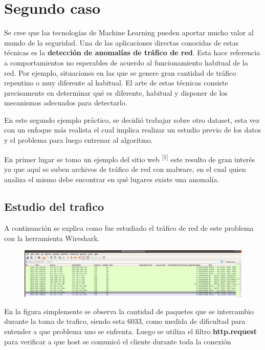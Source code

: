 \documentclass[a4paper,10pt]{article}
\begin{document}
\newpage
\section{Segundo caso}

Se cree que las tecnologías de Machine Learning pueden aportar mucho valor al mundo de la seguridad. Una de las aplicaciones directas conocidas de estas técnicas es la \textbf{detección de anomalías de tráfico de red}. Esta hace referencia a comportamientos no esperables de acuerdo al funcionamiento habitual de la red. Por ejemplo, situaciones en las que se genere gran cantidad de tráfico repentino o muy diferente al habitual. El arte de estas técnicas consiste precisamente en determinar qué es diferente, habitual y disponer de los mecanismos adecuados para detectarlo. 

En este segundo ejemplo práctico, se decidió trabajar sobre otro dataset, esta vez con un enfoque más realista el cual implica realizar un estudio previo de los datos y el problema para luego entrenar al algoritmo.

\medskip
En primer lugar se tomo un ejemplo del sitio web \textsuperscript{[1]} este resulto de gran interés ya que aquí se suben archivos de tráfico de red con malware, en el cual quien analiza el mismo debe encontrar en qué lugares existe una anomalía.

\subsection{Estudio del trafico}

A continuación se explica como fue estudiado el tráfico de red de este problema con la herramienta Wireshark.

\begin{figure}[!htp]
\centering
\includegraphics[scale=0.2]{Wireshark/1.png} 
\caption{}
\end{figure}

En la figura simplemente se observa la cantidad de paquetes que se intercambio durante la toma de trafico, siendo esta 6033, como medida de dificultad para entender a que problema uno se enfrenta.
Luego se utiliza el filtro \textbf{http.request} para verificar a que host se comunicó el cliente durante toda la conexión
\end{document}
